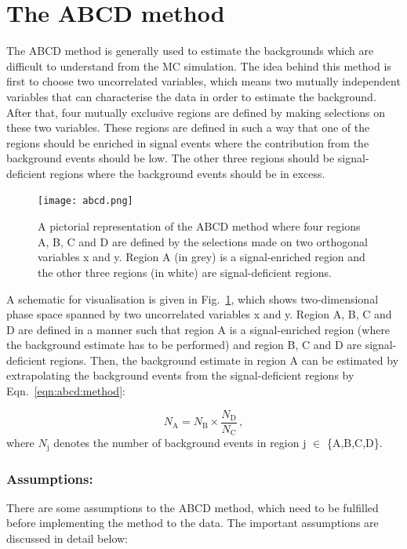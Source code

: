 \section{The ABCD method}
\label{sec:abcd:method}
The ABCD method is generally used to estimate the backgrounds which are difficult to understand from the MC simulation. The idea behind this method is first to choose two uncorrelated variables, which means two mutually independent variables that can characterise the data in order to estimate the background. After that, four mutually exclusive regions are defined by making selections on these two variables. These regions are defined in such a way that one of the regions should be enriched in signal events where the contribution from the background events should be low. The other three regions should be signal-deficient regions where the background events should be in excess.~\cite{thesis:arshia}

\begin{figure}[hbt!]
	\centering
	\texttt{[image: abcd.png]}
	\caption{A pictorial representation of the ABCD method where four regions A, B, C and D are defined by the selections made on two orthogonal variables x and y. Region A (in grey) is a signal-enriched region and the other three regions (in white) are signal-deficient regions.}
	\label{fig:abcd:method}
\end{figure}

A schematic for visualisation is given in Fig.\ \ref{fig:abcd:method}, which shows two-dimensional phase space spanned by two uncorrelated variables x and y. Region A, B, C and D are defined in a manner such that region A is a signal-enriched region (where the background estimate has to be performed) and region B, C and D are signal-deficient regions. Then, the background estimate in region A can be estimated by extrapolating the background events from the signal-deficient regions by Eqn.\ \ref{eqn:abcd:method}:

\begin{equation}
	N_{\text{A}} = N_{\text{B}} \times \frac{N_{\text{D}}}{N_{\text{C}}} \,,
	\label{eqn:abcd:method}
\end{equation}
where $N_{\text{j}}$ denotes the number of background events in region j $\in$ \{A,B,C,D\}.

\subsubsection{Assumptions:}
There are some assumptions to the ABCD method, which need to be fulfilled before implementing the method to the data. The important assumptions are discussed in detail below:

